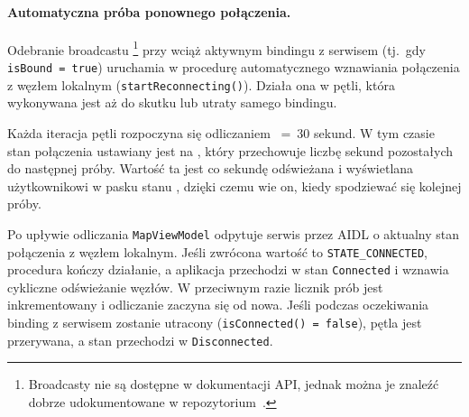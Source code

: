 \paragraph{Automatyczna próba ponownego połączenia.}

Odebranie broadcastu \texttt{} \footnote{Broadcasty nie są dostępne w dokumentacji API, jednak można je znaleźć dobrze udokumentowane w repozytorium~\cite{meshtasticAndroidIntentSource}.} przy wciąż aktywnym bindingu
z serwisem (tj.\ gdy \texttt{isBound~=~true}) uruchamia w \texttt{} procedurę
automatycznego wznawiania połączenia z węzłem lokalnym (\texttt{startReconnecting()}). Działa ona
w pętli, która wykonywana jest aż do skutku lub utraty samego bindingu.

Każda iteracja pętli rozpoczyna się odliczaniem \texttt{}~=~30
sekund. W tym czasie stan połączenia ustawiany jest na \texttt{},
który przechowuje liczbę sekund pozostałych do następnej próby. Wartość ta jest co sekundę
odświeżana i wyświetlana użytkownikowi w pasku stanu \texttt{}, dzięki czemu
wie on, kiedy spodziewać się kolejnej próby.

Po upływie odliczania \texttt{MapViewModel} odpytuje serwis przez AIDL o aktualny stan połączenia z węzłem lokalnym.
Jeśli zwrócona wartość to \texttt{STATE\_CONNECTED}, procedura kończy działanie, a aplikacja
przechodzi w stan \texttt{Connected} i wznawia cykliczne odświeżanie węzłów. W przeciwnym razie
licznik prób jest inkrementowany i odliczanie zaczyna się od nowa. Jeśli podczas oczekiwania
binding z serwisem zostanie utracony (\texttt{isConnected()~=~false}), pętla jest przerywana,
a stan przechodzi w \texttt{Disconnected}.

